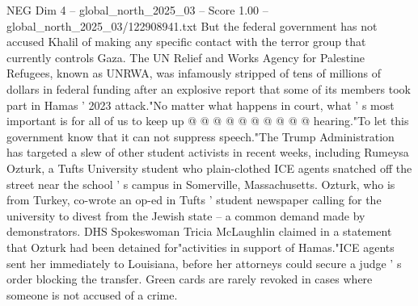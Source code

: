 \begin{textsample}{NEG Dim 4 – global\_north\_2025\_03 – Score 1.00 – global\_north\_2025\_03/122908941.txt}
But the federal government has not accused Khalil of making any specific contact with the terror group that currently controls Gaza.
The UN Relief and Works Agency for Palestine Refugees, known as UNRWA, was infamously stripped of tens of millions of dollars in federal funding after an explosive report that some of its members took part in Hamas ' 2023 attack."No matter what happens in court, what ' s most important is for all of us to keep up @ @ @ @ @ @ @ @ @ @ hearing."To let this government know that it can not suppress speech."The Trump Administration has targeted a slew of other student activists in recent weeks, including Rumeysa Ozturk, a Tufts University student who plain-clothed ICE agents snatched off the street near the school ' s campus in Somerville, Massachusetts.
Ozturk, who is from Turkey, co-wrote an op-ed in Tufts ' student newspaper calling for the university to divest from the Jewish state -- a common demand made by demonstrators.
DHS Spokeswoman Tricia McLaughlin claimed in a statement that Ozturk had been detained for"activities in support of Hamas."ICE agents sent her immediately to Louisiana, before her attorneys could secure a judge ' s order blocking the transfer.
Green cards are rarely revoked in cases where someone is not accused of a crime.

\end{textsample}

